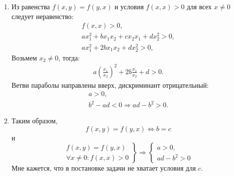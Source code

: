 \documentclass[12pt]{article}
\begin{document}
\begin{enumerate}
        \item
        Из равенства $f(x,y)=f(y,x)$ и условия $f(x,x) > 0$ для всех $x \neq 0$ следует неравенство:
        \begin{gather*}
            f(x,x) > 0 , \\
            a x_1^2 + b x_1 x_2 + c x_2 x_1 + d x_2^2 > 0, \\
            a x_1^2 + 2 b x_1 x_2 + d x_2^2 > 0 ,
        \end{gather*}
        Возьмем $x_2 \neq 0$, тогда:
        \begin{gather*}
            a \left ( \frac{x_1}{x_2} \right )^2 + 2 b \frac{x_1}{x_2} + d > 0 .
        \end{gather*}
        Ветви параболы направлены вверх, дискриминант отрицательный:
        \begin{gather*}
            a > 0, \\
            b^2 - ad < 0 \Rightarrow ad - b^2 > 0 .
        \end{gather*}

        \item
        Таким образом,
        \[
            f(x,y) = f(y,x) \Leftrightarrow b = c
        \]
        и
        \[
            \left .
            \begin{array}{r}
                f(x,y) = f(y,x) \\
                \forall x \neq 0: f(x,x) > 0
            \end{array}
            \right \}
            \Rightarrow
            \left \{
            \begin{array}{l}
                a > 0, \\
                ad - b^2 > 0
            \end{array}
            \right .
        \]
        Мне кажется, что в постановке задачи не хватает условия для $c$.
    \end{enumerate}
\end{document}
